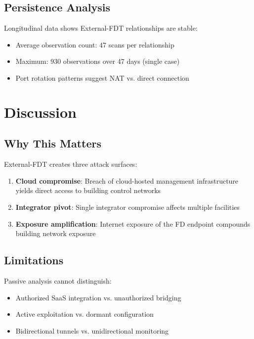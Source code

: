 \documentclass[11pt,a4paper]{article}
\begin{document}
\subsection{Persistence Analysis}

Longitudinal data shows External-FDT relationships are stable:
\begin{itemize}
  \item Average observation count: 47 scans per relationship
  \item Maximum: 930 observations over 47 days (single case)
  \item Port rotation patterns suggest NAT vs. direct connection
\end{itemize}

\section{Discussion}
\label{sec:discussion}

\subsection{Why This Matters}

External-FDT creates three attack surfaces:

\begin{enumerate}
  \item \textbf{Cloud compromise}: Breach of cloud-hosted management 
    infrastructure yields direct access to building control networks
  \item \textbf{Integrator pivot}: Single integrator compromise affects 
    multiple facilities
  \item \textbf{Exposure amplification}: Internet exposure of the FD 
    endpoint compounds building network exposure
\end{enumerate}

\subsection{Limitations}

Passive analysis cannot distinguish:
\begin{itemize}
  \item Authorized SaaS integration vs. unauthorized bridging
  \item Active exploitation vs. dormant configuration
  \item Bidirectional tunnels vs. unidirectional monitoring
\end{itemize}
\end{document}
